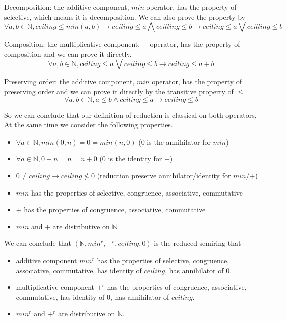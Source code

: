 \documentclass[a4paper,10pt]{article}
\begin{document}
Decomposition: the additive component, $min$ operator, has the property of selective, which means it is decomposition. We can also prove the property by \[\forall a, b\in \mathbb{N}, ceiling \leq min(a,b) \rightarrow ceiling \leq a \bigwedge ceilling \leq b \rightarrow ceiling \leq a \bigvee ceilling \leq b\]

Composition: the multiplicative component, $+$ operator, has the property of composition and we can prove it directly. \[\forall a,b \in \mathbb{N}, ceiling \leq a \bigvee ceiling \leq b \rightarrow ceiling \leq a + b\]

Preserving order: the additive component, $min$ operator, has the property of preserving order and we can prove it directly by the transitive property of $\leq$
\[\forall a,b \in \mathbb{N}, a \leq b \wedge ceiling \leq a \rightarrow ceiling \leq b\]

So we can conclude that our definition of reduction is classical on both operators. At the same time we consider the following properties.
\begin{itemize}
  \item $\forall a \in \mathbb{N}, min(0,n) = 0 = min(n,0)$ (0 is the annihilator for $min$)
  \item $\forall a \in \mathbb{N}, 0 + n = n = n + 0$ (0 is the identity for $+$)
  \item $ 0 \neq ceiling \rightarrow ceiling \not\leq 0$ (reduction preserve annihilator/identity for $min$/$+$)
  \item $min$ has the properties of selective, congruence, associative, commutative
  \item $+$ has the properties of congruence, associative, commutative
  \item $min$ and $+$ are distributive on $\mathbb{N}$
\end{itemize}
We can conclude that $(\mathbb{N},min^r,+^r,ceiling,0)$ is the reduced semiring that 
\begin{itemize}
  \item additive component $min^r$ has the properties of selective, congruence, associative, commutative, has identity of $ceiling$, has annihilator of 0.
  \item multiplicative component $+^r$ has the properties of congruence, associative, commutative, has identity of 0, has annihilator of $ceiling$.
  \item $min^r$ and $+^r$ are distributive on $\mathbb{N}$.
\end{itemize}
 
\end{document}
